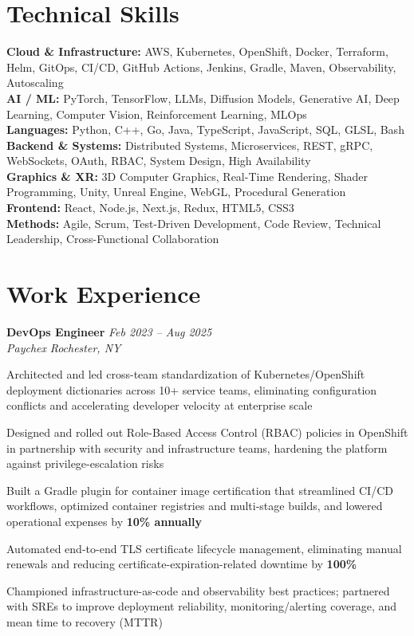 \documentclass[letterpaper,10pt]{article}
\newcommand{\role}[4]{%
  \textbf{#1} \hfill \textit{#3}\\[-1pt]
  \textit{#2} \hfill \textit{#4}\par\vspace{2pt}
}
\begin{document}
\section*{Technical Skills}
\textbf{Cloud \& Infrastructure:} AWS, Kubernetes, OpenShift, Docker, Terraform, Helm, GitOps, CI/CD, GitHub Actions, Jenkins, Gradle, Maven, Observability, Autoscaling\\
\textbf{AI / ML:} PyTorch, TensorFlow, LLMs, Diffusion Models, Generative AI, Deep Learning, Computer Vision, Reinforcement Learning, MLOps\\
\textbf{Languages:} Python, C++, Go, Java, TypeScript, JavaScript, SQL, GLSL, Bash\\
\textbf{Backend \& Systems:} Distributed Systems, Microservices, REST, gRPC, WebSockets, OAuth, RBAC, System Design, High Availability\\
\textbf{Graphics \& XR:} 3D Computer Graphics, Real-Time Rendering, Shader Programming, Unity, Unreal Engine, WebGL, Procedural Generation\\
\textbf{Frontend:} React, Node.js, Next.js, Redux, HTML5, CSS3\\
\textbf{Methods:} Agile, Scrum, Test-Driven Development, Code Review, Technical Leadership, Cross-Functional Collaboration

\section*{Work Experience}
\role{DevOps Engineer}{Paychex}{Feb 2023 -- Aug 2025}{Rochester, NY}
\begin{tightitemize}
  \item Architected and led cross-team standardization of Kubernetes/OpenShift deployment dictionaries across 10+ service teams, eliminating configuration conflicts and accelerating developer velocity at enterprise scale
  \item Designed and rolled out Role-Based Access Control (RBAC) policies in OpenShift in partnership with security and infrastructure teams, hardening the platform against privilege-escalation risks
  \item Built a Gradle plugin for container image certification that streamlined CI/CD workflows, optimized container registries and multi-stage builds, and lowered operational expenses by \textbf{10\% annually}
  \item Automated end-to-end TLS certificate lifecycle management, eliminating manual renewals and reducing certificate-expiration-related downtime by \textbf{100\%}
  \item Championed infrastructure-as-code and observability best practices; partnered with SREs to improve deployment reliability, monitoring/alerting coverage, and mean time to recovery (MTTR)
\end{tightitemize}
\end{document}
